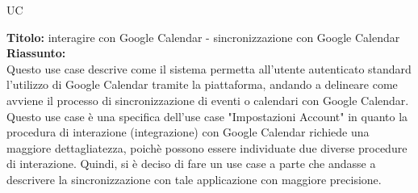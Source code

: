 \begin{listaPersonale}{UC}
\begin{listaPersonale2}[UC] {}
        \newpage

        \begin{center}
            
        \end{center}

        \begin{listaPersonale3} [UC]{}
            \textbf{Titolo:} interagire con Google Calendar - sincronizzazione con Google Calendar\\

            \textbf{Riassunto:} \\
            Questo use case descrive come il sistema permetta all'utente autenticato standard l'utilizzo di Google Calendar tramite la piattaforma, andando a delineare come avviene il processo di sincronizzazione di eventi o calendari con Google Calendar.
            Questo use case è una specifica dell'use case "Impostazioni Account" in quanto la procedura di interazione (integrazione) con Google Calendar richiede una maggiore dettagliatezza, poichè possono essere individuate due diverse procedure di interazione. Quindi, si è deciso di fare un use case a parte che andasse a descrivere la sincronizzazione con tale applicazione con maggiore precisione.


\end{listaPersonale3}
\end{listaPersonale2}
\end{listaPersonale}
